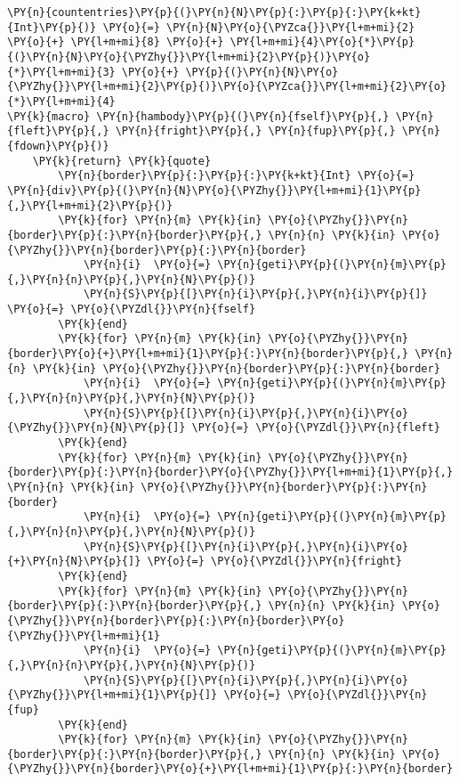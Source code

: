 \begin{Verbatim}[commandchars=\\\{\}]
\PY{n}{countentries}\PY{p}{(}\PY{n}{N}\PY{p}{:}\PY{p}{:}\PY{k+kt}{Int}\PY{p}{)} \PY{o}{=} \PY{n}{N}\PY{o}{\PYZca{}}\PY{l+m+mi}{2} \PY{o}{+} \PY{l+m+mi}{8} \PY{o}{+} \PY{l+m+mi}{4}\PY{o}{*}\PY{p}{(}\PY{n}{N}\PY{o}{\PYZhy{}}\PY{l+m+mi}{2}\PY{p}{)}\PY{o}{*}\PY{l+m+mi}{3} \PY{o}{+} \PY{p}{(}\PY{n}{N}\PY{o}{\PYZhy{}}\PY{l+m+mi}{2}\PY{p}{)}\PY{o}{\PYZca{}}\PY{l+m+mi}{2}\PY{o}{*}\PY{l+m+mi}{4}
\PY{k}{macro} \PY{n}{hambody}\PY{p}{(}\PY{n}{fself}\PY{p}{,} \PY{n}{fleft}\PY{p}{,} \PY{n}{fright}\PY{p}{,} \PY{n}{fup}\PY{p}{,} \PY{n}{fdown}\PY{p}{)}
    \PY{k}{return} \PY{k}{quote}
        \PY{n}{border}\PY{p}{:}\PY{p}{:}\PY{k+kt}{Int} \PY{o}{=} \PY{n}{div}\PY{p}{(}\PY{n}{N}\PY{o}{\PYZhy{}}\PY{l+m+mi}{1}\PY{p}{,}\PY{l+m+mi}{2}\PY{p}{)}
        \PY{k}{for} \PY{n}{m} \PY{k}{in} \PY{o}{\PYZhy{}}\PY{n}{border}\PY{p}{:}\PY{n}{border}\PY{p}{,} \PY{n}{n} \PY{k}{in} \PY{o}{\PYZhy{}}\PY{n}{border}\PY{p}{:}\PY{n}{border}
            \PY{n}{i}  \PY{o}{=} \PY{n}{geti}\PY{p}{(}\PY{n}{m}\PY{p}{,}\PY{n}{n}\PY{p}{,}\PY{n}{N}\PY{p}{)}
            \PY{n}{S}\PY{p}{[}\PY{n}{i}\PY{p}{,}\PY{n}{i}\PY{p}{]} \PY{o}{=} \PY{o}{\PYZdl{}}\PY{n}{fself}
        \PY{k}{end}
        \PY{k}{for} \PY{n}{m} \PY{k}{in} \PY{o}{\PYZhy{}}\PY{n}{border}\PY{o}{+}\PY{l+m+mi}{1}\PY{p}{:}\PY{n}{border}\PY{p}{,} \PY{n}{n} \PY{k}{in} \PY{o}{\PYZhy{}}\PY{n}{border}\PY{p}{:}\PY{n}{border}
            \PY{n}{i}  \PY{o}{=} \PY{n}{geti}\PY{p}{(}\PY{n}{m}\PY{p}{,}\PY{n}{n}\PY{p}{,}\PY{n}{N}\PY{p}{)}
            \PY{n}{S}\PY{p}{[}\PY{n}{i}\PY{p}{,}\PY{n}{i}\PY{o}{\PYZhy{}}\PY{n}{N}\PY{p}{]} \PY{o}{=} \PY{o}{\PYZdl{}}\PY{n}{fleft}
        \PY{k}{end}
        \PY{k}{for} \PY{n}{m} \PY{k}{in} \PY{o}{\PYZhy{}}\PY{n}{border}\PY{p}{:}\PY{n}{border}\PY{o}{\PYZhy{}}\PY{l+m+mi}{1}\PY{p}{,} \PY{n}{n} \PY{k}{in} \PY{o}{\PYZhy{}}\PY{n}{border}\PY{p}{:}\PY{n}{border}
            \PY{n}{i}  \PY{o}{=} \PY{n}{geti}\PY{p}{(}\PY{n}{m}\PY{p}{,}\PY{n}{n}\PY{p}{,}\PY{n}{N}\PY{p}{)}
            \PY{n}{S}\PY{p}{[}\PY{n}{i}\PY{p}{,}\PY{n}{i}\PY{o}{+}\PY{n}{N}\PY{p}{]} \PY{o}{=} \PY{o}{\PYZdl{}}\PY{n}{fright}
        \PY{k}{end}
        \PY{k}{for} \PY{n}{m} \PY{k}{in} \PY{o}{\PYZhy{}}\PY{n}{border}\PY{p}{:}\PY{n}{border}\PY{p}{,} \PY{n}{n} \PY{k}{in} \PY{o}{\PYZhy{}}\PY{n}{border}\PY{p}{:}\PY{n}{border}\PY{o}{\PYZhy{}}\PY{l+m+mi}{1}
            \PY{n}{i}  \PY{o}{=} \PY{n}{geti}\PY{p}{(}\PY{n}{m}\PY{p}{,}\PY{n}{n}\PY{p}{,}\PY{n}{N}\PY{p}{)}
            \PY{n}{S}\PY{p}{[}\PY{n}{i}\PY{p}{,}\PY{n}{i}\PY{o}{\PYZhy{}}\PY{l+m+mi}{1}\PY{p}{]} \PY{o}{=} \PY{o}{\PYZdl{}}\PY{n}{fup}
        \PY{k}{end}
        \PY{k}{for} \PY{n}{m} \PY{k}{in} \PY{o}{\PYZhy{}}\PY{n}{border}\PY{p}{:}\PY{n}{border}\PY{p}{,} \PY{n}{n} \PY{k}{in} \PY{o}{\PYZhy{}}\PY{n}{border}\PY{o}{+}\PY{l+m+mi}{1}\PY{p}{:}\PY{n}{border}

\end{Verbatim}
